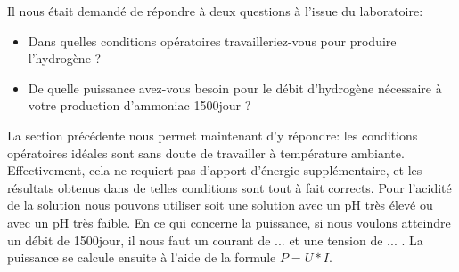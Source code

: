 Il nous était demandé de répondre à deux questions à l'issue du laboratoire:
\begin{itemize}
\item Dans quelles conditions opératoires travailleriez-vous pour produire l’hydrogène ?
\item De quelle puissance avez-vous besoin pour le débit d’hydrogène nécessaire à votre production d’ammoniac \unit{1500}{\tonne \per jour} ? 
\end{itemize}
La section précédente nous permet maintenant d'y répondre: les conditions opératoires idéales sont sans doute
de travailler à température ambiante. Effectivement, cela ne requiert pas d'apport d'énergie supplémentaire, et 
les résultats obtenus dans de telles conditions sont tout à fait corrects. Pour l'acidité de la solution nous pouvons
utiliser soit une solution avec un pH très élevé ou avec un pH très faible. En ce qui concerne la puissance, si nous 
voulons atteindre un débit de \unit{1500}{\tonne \per jour}, il nous faut un courant de ... et une tension de ... . La puissance se calcule ensuite à l'aide de la formule $P = U*I$.
